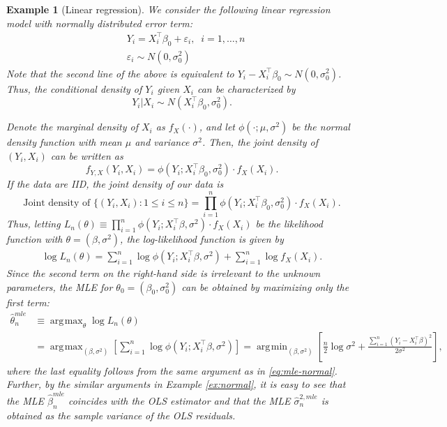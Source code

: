 \documentclass[10.5pt, A4paper, openany, uplatex]{book}
\newcommand{\eps}{\varepsilon}
\renewcommand{\hat}{\widehat}
\newtheorem{example}[theorem]{Example}
\numberwithin{equation}{section}
\DeclareMathOperator*{\argmin}{\arg\!\min}
\DeclareMathOperator*{\argmax}{\arg\!\max}
\begin{document}
\begin{example}[Linear regression]\upshape
	We consider the following linear regression model with normally distributed error term:
	\begin{align*}
	& Y_i = X_i^\top \beta_0 + \eps_i, \;\; i = 1, \ldots, n \\
	& \eps_i \sim N(0, \sigma_0^2)
	\end{align*}
	Note that the second line of the above is equivalent to $Y_i - X_i^\top \beta_0 \sim N(0, \sigma_0^2)$.
	Thus, the conditional density of $Y_i$ given $X_i$ can be characterized by
	\[
	Y_i | X_i \sim N(X_i^\top \beta_0, \sigma_0^2).
	\]
	
	Denote the marginal density of $X_i$ as $f_X(\cdot)$, and let $\phi(\cdot ; \mu, \sigma^2)$ be the normal density function with mean $\mu$ and variance $\sigma^2$.
	Then, the joint density of $(Y_i, X_i)$ can be written as
	\[
	f_{Y,X}(Y_i, X_i) = \phi(Y_i ; X_i^\top \beta_0, \sigma_0^2) \cdot f_X(X_i).
	\]
	If the data are IID, the joint density of our data is
	\[
	\text{Joint density of }\{(Y_i, X_i): 1 \le i \le n\} = \prod_{i = 1}^n \phi(Y_i ; X_i^\top \beta_0, \sigma_0^2) \cdot f_X(X_i).
	\]
	Thus, letting $L_n(\theta) \equiv \prod_{i = 1}^n \phi(Y_i ; X_i^\top \beta, \sigma^2) \cdot f_X(X_i)$ be the likelihood function with $\theta = (\beta, \sigma^2)$,  the log-likelihood function is given by
	\begin{align*}
	\log L_n(\theta) = \sum_{i = 1}^n \log \phi(Y_i ; X_i ^\top \beta, \sigma^2) + \sum_{i=1}^n \log f_X(X_i).
	\end{align*}
	Since the second term on the right-hand side is irrelevant to the unknown parameters, the MLE for $\theta_0 = (\beta_0, \sigma_0^2)$ can be obtained by maximizing only the first term:
	\begin{align*}
	\hat \theta_n^{mle} 
	& \equiv \argmax_\theta \log L_n(\theta) \\
	& = \argmax_{(\beta, \sigma^2)} \left[ \sum_{i = 1}^n \log \phi(Y_i ; X_i ^\top \beta, \sigma^2)  \right] =  \argmin_{(\beta, \sigma^2)} \left[ \frac{n}{2}\log \sigma^2 + \frac{\sum_{i=1}^n (Y_i - X_i ^\top \beta)^2}{2 \sigma^2}\right],
	\end{align*}
	where the last equality follows from the same argument as in \eqref{eq:mle-normal}.
	Further, by the similar arguments in Example \ref{ex:normal}, it is easy to see that the MLE $\hat \beta_n^{mle}$ coincides with the OLS estimator and that the MLE $\hat \sigma_n^{2, mle}$ is obtained as the sample variance of the OLS residuals.
\end{example}
\end{document}
